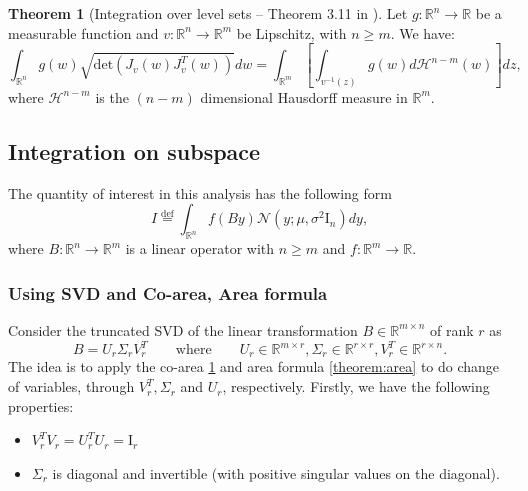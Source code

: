 \documentclass[a4paper,10pt]{article}
\theoremstyle{definition} %
\theoremstyle{definition} %
\theoremstyle{definition} %
\newtheorem{theorem}[definition]{Theorem}
\theoremstyle{definition} %
\newcommand{\R}{\mathbb{R}}
\newcommand{\Normal}[1]{\mathcal{N}\left( {#1} \right)}
\newcommand{\Id}{\mathrm{I}}
\newcommand{\0}{\boldsymbol{0}}
\renewcommand{\H}{\mathcal{H}}
\renewcommand{\det}[1]{\mathrm{det}\left( #1 \right)}
\newcommand{\eqdef}{\stackrel{\mathrm{def}}{=}}
\begin{document}
\begin{theorem}[Integration over level sets -- Theorem 3.11 in \cite{evans2018measure}]
    \label{theorem:coarea}
    Let $g: \R^n \to \R$ be a measurable function and $v: \R^n \to \R^m$ be Lipschitz, with $n \geqslant m$. We have: 
    \begin{equation*}
        \int_{\R^n} g(w) \sqrt{\det{J_v(w) J_v^T(w)}} dw = \int_{\R^m} \left[ \int_{v^{-1}(z)} g(w) d\H^{n - m}(w) \right] dz,
    \end{equation*}
    where $\H^{n - m}$ is the $(n - m)$ dimensional Hausdorff measure in $\R^m$. 
\end{theorem}

\subsection{Integration on subspace}
The quantity of interest in this analysis has the following form 
\begin{equation*}
    I \eqdef \int_{\R^n} f(B y) \Normal{y; \mu, \sigma^2 \Id_n} dy ,
\end{equation*}
where $B: \R^n \to \R^m$  is a linear operator with  $n \geqslant m$ and $f:\R^m \to \R$.
\subsubsection*{Using SVD and Co-area, Area formula}
Consider the truncated SVD of the linear transformation $B \in \R^{m \times n}$ of rank $r$ as 
\begin{equation*}
    B = U_r \Sigma_r V_r^T \qquad \mbox{where} \qquad U_r \in \R^{m \times r}, \Sigma_r \in \R^{r \times r}, V_r^T \in \R^{r \times n}.
\end{equation*}
The idea is to apply the co-area \cref{theorem:coarea} and area formula \cref{theorem:area} to do change of variables, through $V_r^T, \Sigma_r$ and $U_r$, respectively.
Firstly, we have the following properties:
\begin{itemize}
    \item[] $V_r^T V_r = U_r^T U_r = \Id_r$
    \item[] $\Sigma_r$ is diagonal and invertible (with positive singular values on the diagonal).
\end{itemize}
\end{document}
